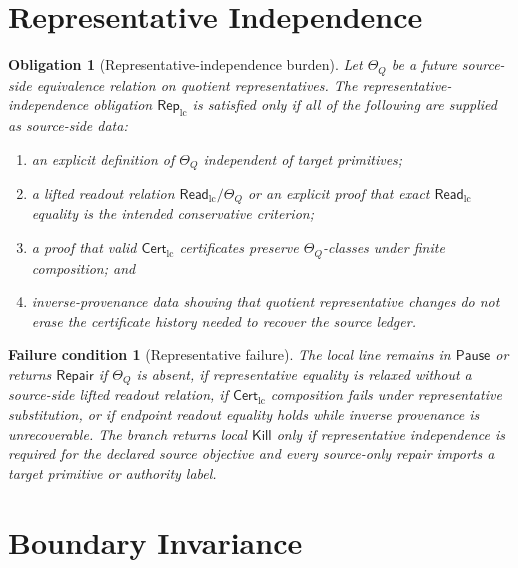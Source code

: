 \documentclass[11pt]{article}
\newcommand{\CertLC}{\mathsf{Cert}_{\mathrm{lc}}}
\newcommand{\ReadLC}{\mathsf{Read}_{\mathrm{lc}}}
\newcommand{\RepLC}{\mathsf{Rep}_{\mathrm{lc}}}
\newcommand{\Pause}{\mathsf{Pause}}
\newcommand{\Repair}{\mathsf{Repair}}
\newcommand{\Kill}{\mathsf{Kill}}
\newtheorem{obligation}{Obligation}
\newtheorem{failurecondition}{Failure condition}
\begin{document}
\section{Representative Independence}

\begin{obligation}[Representative-independence burden]
Let \(\Theta_Q\) be a future source-side equivalence relation on
quotient representatives. The representative-independence obligation
\(\RepLC\) is satisfied only if all of the following are supplied as
source-side data:
\begin{enumerate}
    \item an explicit definition of \(\Theta_Q\) independent of target
    primitives;
    \item a lifted readout relation \(\ReadLC/\Theta_Q\) or an explicit
    proof that exact \(\ReadLC\) equality is the intended conservative
    criterion;
    \item a proof that valid \(\CertLC\) certificates preserve
    \(\Theta_Q\)-classes under finite composition; and
    \item inverse-provenance data showing that quotient representative
    changes do not erase the certificate history needed to recover the
    source ledger.
\end{enumerate}
\end{obligation}

\begin{failurecondition}[Representative failure]
The local line remains in \(\Pause\) or returns \(\Repair\) if
\(\Theta_Q\) is absent, if representative equality is relaxed without a
source-side lifted readout relation, if \(\CertLC\) composition fails
under representative substitution, or if endpoint readout equality
holds while inverse provenance is unrecoverable. The branch returns
local \(\Kill\) only if representative independence is required for the
declared source objective and every source-only repair imports a target
primitive or authority label.
\end{failurecondition}

\section{Boundary Invariance}
\end{document}
